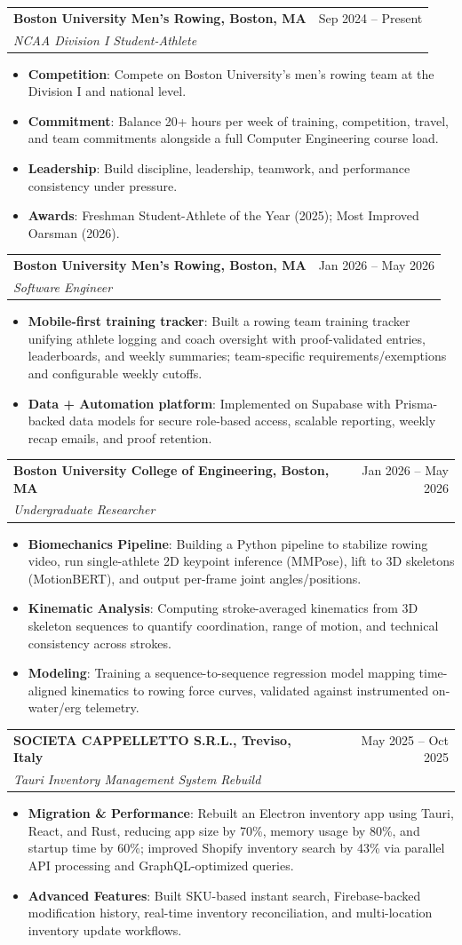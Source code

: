 \documentclass[letterpaper,11pt]{article}
\makeatletter
\newcommand{\resumeItem}[2]{
  \item\small{
    \textbf{#1}{: #2 \vspace{-2pt}}
  }
}
\newcommand{\resumeSubheading}[4]{
  \vspace{-1pt}\item
    \begin{tabular*}{0.97\textwidth}[t]{l@{\extracolsep{\fill}}r}
      \textbf{#1} & #2 \\
      \textit{\small#3} & \textit{\small #4} \\
    \end{tabular*}\vspace{-5pt}
}
\newcommand{\resumeItemListStart}{\begin{itemize}}
\newcommand{\resumeItemListEnd}{\end{itemize}\vspace{-5pt}}
\makeatother
\begin{document}
\resumeSubheading
{Boston University Men's Rowing, Boston, MA}{Sep 2024 -- Present}
{NCAA Division I Student-Athlete}{}
\resumeItemListStart
\resumeItem{Competition}{Compete on Boston University's men's rowing team at the Division I and national level.}
\resumeItem{Commitment}{Balance 20+ hours per week of training, competition, travel, and team commitments alongside a full Computer Engineering course load.}
\resumeItem{Leadership}{Build discipline, leadership, teamwork, and performance consistency under pressure.}
\resumeItem{Awards}{Freshman Student-Athlete of the Year (2025); Most Improved Oarsman (2026).}
\resumeItemListEnd

\resumeSubheading
{Boston University Men's Rowing, Boston, MA}{Jan 2026 -- May 2026}
{Software Engineer}{}
\resumeItemListStart
\resumeItem{Mobile-first training tracker}{Built a rowing team training tracker unifying athlete logging and coach oversight with proof-validated entries, leaderboards, and weekly summaries; team-specific requirements/exemptions and configurable weekly cutoffs.}
\resumeItem{Data + Automation platform}{Implemented on Supabase with Prisma-backed data models for secure role-based access, scalable reporting, weekly recap emails, and proof retention.}
\resumeItemListEnd

\resumeSubheading
{Boston University College of Engineering, Boston, MA}{Jan 2026 -- May 2026}
{Undergraduate Researcher}{}
\resumeItemListStart
\resumeItem{Biomechanics Pipeline}{Building a Python pipeline to stabilize rowing video, run single-athlete 2D keypoint inference (MMPose), lift to 3D skeletons (MotionBERT), and output per-frame joint angles/positions.}
\resumeItem{Kinematic Analysis}{Computing stroke-averaged kinematics from 3D skeleton sequences to quantify coordination, range of motion, and technical consistency across strokes.}
\resumeItem{Modeling}{Training a sequence-to-sequence regression model mapping time-aligned kinematics to rowing force curves, validated against instrumented on-water/erg telemetry.}
\resumeItemListEnd



\resumeSubheading
{SOCIETA CAPPELLETTO S.R.L., Treviso, Italy}{May 2025 -- Oct 2025}
{Tauri Inventory Management System Rebuild}{}
\resumeItemListStart
\resumeItem{Migration \& Performance}
{Rebuilt an Electron inventory app using Tauri, React, and Rust, reducing app size by 70\%, memory usage by 80\%, and startup time by 60\%; improved Shopify inventory search by 43\% via parallel API processing and GraphQL-optimized queries.}
\resumeItem{Advanced Features}
{Built SKU-based instant search, Firebase-backed modification history, real-time inventory reconciliation, and multi-location inventory update workflows.}
\resumeItemListEnd
\end{document}
